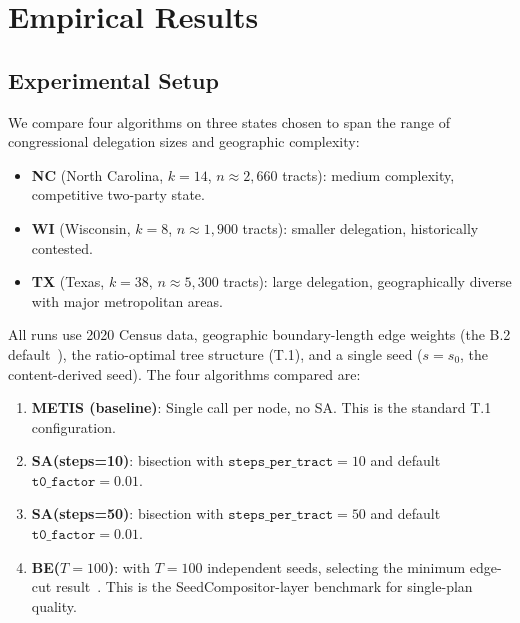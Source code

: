 \section{Empirical Results}
\label{sec:empirical}

\subsection{Experimental Setup}

We compare four algorithms on three states chosen to span the range of
congressional delegation sizes and geographic complexity:
\begin{itemize}
\item \textbf{NC} (North Carolina, $k=14$, $n \approx 2{,}660$ tracts):
  medium complexity, competitive two-party state.
\item \textbf{WI} (Wisconsin, $k=8$, $n \approx 1{,}900$ tracts):
  smaller delegation, historically contested.
\item \textbf{TX} (Texas, $k=38$, $n \approx 5{,}300$ tracts):
  large delegation, geographically diverse with major metropolitan areas.
\end{itemize}

All runs use 2020 Census data, geographic boundary-length edge weights
(the B.2 default~\citep{b2paper}), the \geosec{} ratio-optimal tree structure
(T.1), and a single seed ($s = s_0$, the content-derived seed).
The four algorithms compared are:

\begin{enumerate}
\item \textbf{METIS (baseline)}: Single \metis{} call per node, no SA.
  This is the standard T.1 configuration.
\item \textbf{SA(steps=10)}: \sa{} bisection with $\mathtt{steps\_per\_tract} = 10$
  and default $\mathtt{t0\_factor} = 0.01$.
\item \textbf{SA(steps=50)}: \sa{} bisection with $\mathtt{steps\_per\_tract} = 50$
  and default $\mathtt{t0\_factor} = 0.01$.
\item \textbf{BE($T=100$)}: \be{} with $T=100$ independent seeds, selecting
  the minimum edge-cut result~\citep{h1paper}.
  This is the SeedCompositor-layer benchmark for single-plan quality.
\end{enumerate}

